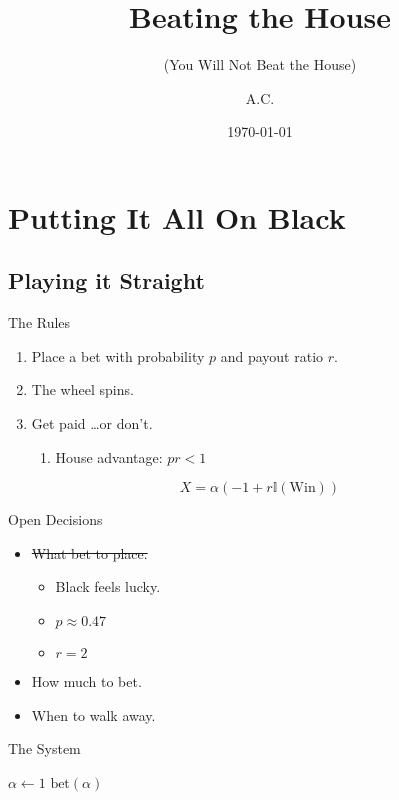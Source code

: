 \documentclass[pdf]{beamer}
\title{Beating the House}
\subtitle{(You Will Not Beat the House)}
\author{A.C.}
\date{\today}
\begin{document}
\begin{frame}
  \titlepage
\end{frame}

\section{Putting It All On Black}

\subsection{Playing it Straight}

\begin{frame}{The Rules}
  \begin{enumerate}
  \item Place a bet with probability $p$ and payout ratio $r$.
  \pause\item The wheel spins.
  \pause\item Get paid \ldots or don't.
    \begin{enumerate}
      \item House advantage: $pr < 1$
    \end{enumerate}
  \end{enumerate}

  \[ X = \alpha \left(-1 + r\mathbb{I}(\text{Win})\right) \]
\end{frame}

\begin{frame}{Open Decisions}
  \begin{itemize}
  \item \sout{What bet to place.}
    \begin{itemize}
    \item Black feels lucky.
    \item $p \approx 0.47$
    \item $r = 2$
    \end{itemize}
  \pause\item How much to bet.
  \pause\item When to walk away.
  \end{itemize}
\end{frame}

\begin{frame}{The System}
  \begin{algorithmic}
    \State $\alpha \gets 1$
      \State $\text{bet}(\alpha)$
    \EndWhile
    \EndProcedure
  \end{algorithmic}
\end{frame}
\end{document}
